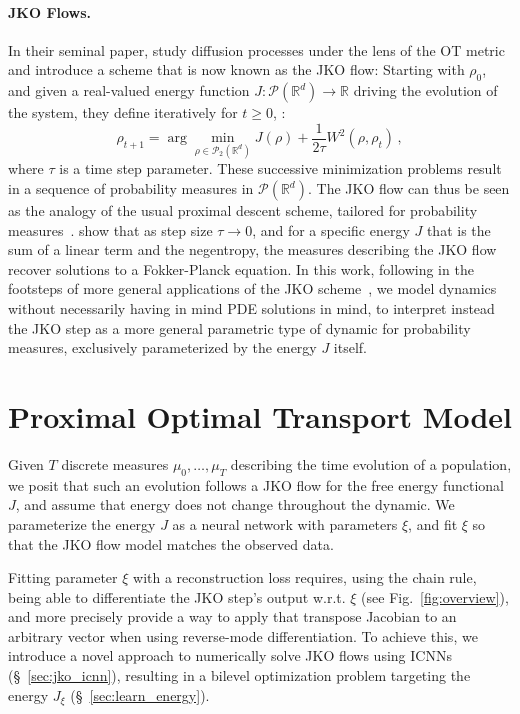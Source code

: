 \paragraph{JKO Flows.}
In their seminal paper, \citet{jordan1998variational} study diffusion processes under the lens of the OT metric \citep[see also][]{ambrosio2006gradient} and introduce a scheme that is now known as the JKO flow: Starting with $\rho_0$, and given a real-valued energy function $J:\mathcal{P}(\mathbb{R}^d)\rightarrow \mathbb{R}$ driving the evolution of the system, they define iteratively for $t\geq 0$, :
\begin{equation} \label{eq:jko}
    \rho_{t+1} = \arg \min_{\rho\in \mathcal{P}_2(\mathbb{R}^d)} J(\rho) + \frac{1}{2\tau} W^2(\rho, \rho_{t})\,,
\end{equation}
where $\tau$ is a time step parameter. These successive minimization problems result in a sequence of probability measures in $\mathcal{P}(\mathbb{R}^d)$. The JKO flow can thus be seen as the analogy of the usual proximal descent scheme, tailored for probability measures~\citep[p.285]{santambrogio2015optimal}. \citet{jordan1998variational} show that as step size $\tau \rightarrow 0$, and for a specific energy $J$ that is the sum of a linear term and the negentropy, the measures describing the JKO flow recover solutions to a Fokker-Planck equation. In this work, following in the footsteps of more general applications of the JKO scheme~\citep[\S4.8]{santambrogio2017euclidean}, we model dynamics without necessarily having in mind PDE solutions in mind, to interpret instead the JKO step as a more general parametric type of dynamic for probability measures, exclusively parameterized by the energy $J$ itself.


\section{Proximal Optimal Transport Model} 

Given $T$ discrete measures $\mu_0, \dots, \mu_T$ describing the time evolution of a population, we posit that such an evolution follows a JKO flow for the free energy functional $J$, and assume that energy does not change throughout the dynamic. We parameterize the energy $J$ as a neural network with parameters $\xi$, and fit $\xi$ so that the JKO flow model matches the observed data. 

Fitting parameter $\xi$ with a reconstruction loss requires, using the chain rule, being able to differentiate the JKO step's output w.r.t. $\xi$ (see Fig.~\ref{fig:overview}), and more precisely provide a way to apply that transpose Jacobian to an arbitrary vector when using reverse-mode differentiation. To achieve this, we introduce a novel approach to numerically solve JKO flows using ICNNs (\S~\ref{sec:jko_icnn}), resulting in a bilevel optimization problem targeting the energy $J_\xi$ (\S~\ref{sec:learn_energy}).


